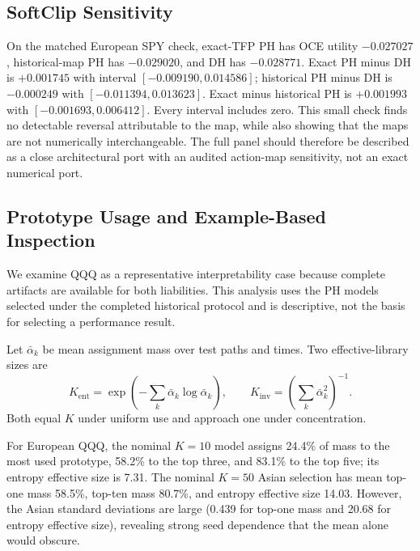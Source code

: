 \documentclass[conference]{IEEEtran}
\begin{document}
\subsection{SoftClip Sensitivity}

On the matched European SPY check, exact-TFP PH has OCE utility $-0.027027$,
historical-map PH has $-0.029020$, and DH has $-0.028771$. Exact PH minus DH is
$+0.001745$ with interval $[-0.009190,0.014586]$; historical PH minus DH is
$-0.000249$ with $[-0.011394,0.013623]$. Exact minus historical PH is
$+0.001993$ with $[-0.001693,0.006412]$. Every interval includes zero. This
small check finds no detectable reversal attributable to the map, while also
showing that the maps are not numerically interchangeable. The full panel
should therefore be described as a close architectural port with an audited
action-map sensitivity, not an exact numerical port.

\subsection{Prototype Usage and Example-Based Inspection}

We examine QQQ as a representative interpretability case because complete
artifacts are available for both liabilities. This analysis uses the PH models
selected under the completed historical protocol and is descriptive, not the
basis for selecting a performance result.

Let $\bar\alpha_k$ be mean assignment mass over test paths and times. Two
effective-library sizes are
\begin{equation}
K_{\mathrm{ent}}=\exp\left(-\sum_k\bar\alpha_k\log\bar\alpha_k\right),
\qquad
K_{\mathrm{inv}}=\left(\sum_k\bar\alpha_k^2\right)^{-1}.
\end{equation}
Both equal $K$ under uniform use and approach one under concentration.

\begin{table}[t]
\centering
\footnotesize
\resizebox{\columnwidth}{!}{}
\caption{Mean prototype concentration for the selected QQQ policies across
three seeds. The Asian averages have substantial cross-seed variability and
should not be interpreted as a stable single-policy sparsity estimate.}
\label{tab:interpretability}
\end{table}

For European QQQ, the nominal $K=10$ model assigns 24.4\% of mass to the most
used prototype, 58.2\% to the top three, and 83.1\% to the top five; its entropy
effective size is 7.31. The nominal $K=50$ Asian selection has mean top-one
mass 58.5\%, top-ten mass 80.7\%, and entropy effective size 14.03. However,
the Asian standard deviations are large (0.439 for top-one mass and 20.68 for
entropy effective size), revealing strong seed dependence that the mean alone
would obscure.
\end{document}

